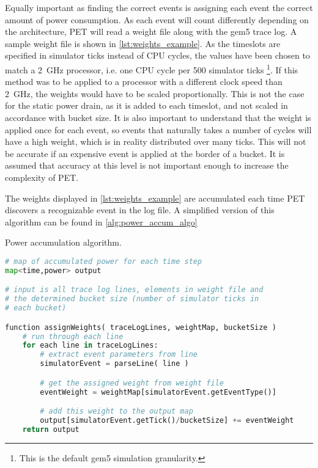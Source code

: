 Equally important as finding the correct events is assigning each event the
correct amount of power consumption. As each event will count differently
depending on the architecture, PET will read a weight file along with the gem5
trace log. A sample weight file is shown in \autoref{lst:weights_example}. As
the timeslots are specified in simulator ticks instead of CPU cycles, the values
have been chosen to match a 2~GHz processor, i.e. one CPU cycle per 500
simulator ticks \footnote{This is the default gem5 simulation granularity.}. If
this method was to be applied to a processor with a different clock speed than
2~GHz, the weights would have to be scaled proportionally. This is not the case
for the static power drain, as it is added to each timeslot, and not scaled in
accordance with bucket size. It is also important to understand that the weight
is applied once for each event, so events that naturally takes a number of
cycles will have a high weight, which is in reality distributed over many ticks.
This will not be accurate if an expensive event is applied at the border of a
bucket. It is assumed that accuracy at this level is not important enough to
increase the complexity of PET.



The weights displayed in \autoref{lst:weights_example} are accumulated each time
PET discovers a recognizable event in the log file. A simplified version of this
algorithm can be found in
\autoref{alg:power_accum_algo}

\begin{algorithm}
\caption{Power accumulation algorithm.}
\label{alg:power_accum_algo}
\begin{lstlisting}[language=Python,style=algo]
# map of accumulated power for each time step
map<time,power> output

# input is all trace log lines, elements in weight file and
# the determined bucket size (number of simulator ticks in
# each bucket)

function assignWeights( traceLogLines, weightMap, bucketSize )
    # run through each line
    for each line in traceLogLines:
        # extract event parameters from line
        simulatorEvent = parseLine( line )

        # get the assigned weight from weight file
        eventWeight = weightMap[simulatorEvent.getEventType()]

        # add this weight to the output map
        output[simulatorEvent.getTick()/bucketSize] += eventWeight
    return output
\end{lstlisting}
\end{algorithm}

